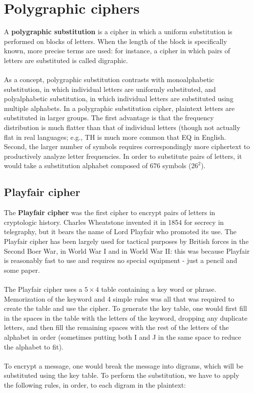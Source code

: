 \documentclass[Lau,binding=0.6cm,oneside]{sapthesis}
\begin{document}
\section{Polygraphic ciphers}
A \textbf{polygraphic substitution} is a cipher in which a uniform substitution is performed on blocks of letters. When the length of the block is specifically known, more precise terms are used: for instance, a cipher in which pairs of letters are substituted is called digraphic.\\\\
As a concept, polygraphic substitution contrasts with monoalphabetic substitution, in which individual letters are uniformly substituted, and polyalphabetic substitution, in which individual letters are substituted using multiple alphabets. In a polygraphic substitution cipher, plaintext letters are substituted in larger groups. The first advantage is that the frequency distribution is much flatter than that of individual letters (though not actually flat in real languages; e.g., \textsf{TH} is much more common that \textsf{EQ} in English. Second, the larger number of symbols requires correspondingly more ciphertext to productively analyze letter frequencies. In order to substitute pairs of letters, it would take a substitution alphabet composed of 676 symbols ($26^{2}$).

\subsection{Playfair cipher}
The \textbf{Playfair cipher} was the first cipher to encrypt pairs of letters in cryptologic history. Charles Wheatstone invented it in 1854 for secrecy in telegraphy, but it bears the name of Lord Playfair who promoted its use\supercite{playfair}. The Playfair cipher has been largely used for tactical purposes by British forces in the Second Boer War, in World War I and in World War II: this was because Playfair is reasonably fast to use and requires no special equipment - just a pencil and some paper.\\\\
The Playfair cipher uses a $5 \times 4$ table containing a key word or phrase. Memorization of the keyword and 4 simple rules was all that was required to create the table and use the cipher. To generate the key table, one would first fill in the spaces in the table with the letters of the keyword, dropping any duplicate letters, and then fill the remaining spaces with the rest of the letters of the alphabet in order (sometimes putting both I and J in the same space to reduce the alphabet to fit).\\\\
To encrypt a message, one would break the message into digrams, which will be substituted using the key table. To perform the substitution, we have to apply the following rules, in order, to each digram in the plaintext:
\end{document}
